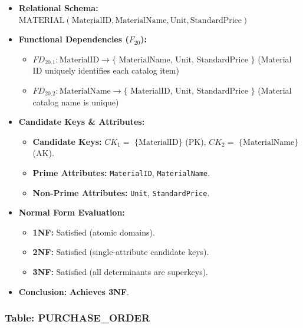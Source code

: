 \documentclass[a4paper,12pt]{report}
\begin{document}
\begin{itemize}
\item
  \textbf{Relational Schema:} \(\text{MATERIAL}(\underline{\text{MaterialID}}, \text{MaterialName}, \text{Unit}, \text{StandardPrice})\)
\item
  \textbf{Functional Dependencies (\(F_{20}\)):}

  \begin{itemize}
  \item
    \(FD_{20.1}: \text{MaterialID} \rightarrow \{\) \(\text{MaterialName}\), \(\text{Unit}\), \(\text{StandardPrice}\) \(\}\) (Material ID uniquely identifies each catalog item)
  \item
    \(FD_{20.2}: \text{MaterialName} \rightarrow \{\) \(\text{MaterialID}\), \(\text{Unit}\), \(\text{StandardPrice}\) \(\}\) (Material catalog name is unique)
  \end{itemize}
\item
  \textbf{Candidate Keys \& Attributes:}

  \begin{itemize}
  \item
    \textbf{Candidate Keys:} \(CK_{1} =\) \(\{\text{MaterialID}\}\) (PK), \(CK_{2} =\) \(\{\text{MaterialName}\}\) (AK).
  \item
    \textbf{Prime Attributes:} \texttt{MaterialID}, \texttt{MaterialName}.
  \item
    \textbf{Non-Prime Attributes:} \texttt{Unit}, \texttt{StandardPrice}.
  \end{itemize}
\item
  \textbf{Normal Form Evaluation:}

  \begin{itemize}
  \item
    \textbf{1NF:} Satisfied (atomic domains).
  \item
    \textbf{2NF:} Satisfied (single-attribute candidate keys).
  \item
    \textbf{3NF:} Satisfied (all determinants are superkeys).
  \end{itemize}
\item
  \textbf{Conclusion:} \textbf{Achieves 3NF}.
\end{itemize}

\subsubsection{\texorpdfstring{Table: PURCHASE\_\allowbreak{}ORDER}{Table: PURCHASEORDER}}\label{table-purchase_order}
\end{document}
